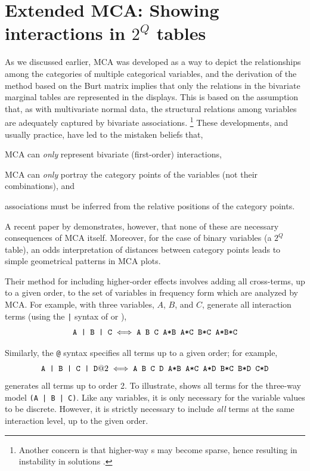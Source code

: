 \section{Extended MCA: Showing interactions in $2^Q$ tables}\label{sec:ca-mcainter}
As we discussed earlier,
MCA was developed as a way to depict the relationships among the
categories of multiple categorical variables, and the derivation of
the method based on the Burt matrix implies that only the relations
in the bivariate marginal tables are represented in the displays.
This is based on the assumption \citep{Gifi:90,Greenacre:88}
that, as with multivariate normal data, the structural relations
among variables are adequately captured by bivariate associations.%
\footnote{Another concern is that higher-way \ctab s may become
sparse, hence resulting in instability in solutions
\citep{Heijden:87}.}
These developments, and usually practice, have led to the mistaken beliefs that,
\begin{seriate}
\item MCA can \emph{only}
represent bivariate (first-order) interactions,
\item MCA can \emph{only} portray the category points of the variables
(not their combinations), and
\item associations must be inferred from the relative positions of
the category points.
\end{seriate}

A recent paper by \citet{MeulmanHeiser:97} demonstrates, however,
that none of these are necessary consequences of MCA itself.
Moreover, for the case of binary variables (a $2^Q$ table),
an odds interpretation of distances between category points
leads to simple geometrical patterns in MCA plots.

Their method for including higher-order effects involves adding all cross-terms,
up to a given order,
to the set of variables in frequency form which are analyzed by
MCA.  For example, with three variables, $A$, $B$, and $C$,
generate all interaction terms (using the \texttt{|} syntax of
 or ),
\begin{equation*}
\mbox{\texttt{A | B | C}} \iff \mbox{\texttt{A B C A*B A*C B*C A*B*C}}
\end{equation*}

Similarly, the \texttt{@} syntax specifies all terms up to a given
order; for example,
\begin{equation*}
\mbox{\texttt{A | B | C | D}@2} \iff \mbox{\texttt{A B C D A*B A*C A*D B*C B*D C*D}}
\end{equation*}
generates all
terms up to order 2.  To illustrate,  shows all terms
for the three-way model \texttt{(A | B | C)}.
Like any  variables, it is only necessary for the variable
values to be discrete.
However, it is strictly necessary to include \emph{all} terms at the same
interaction level, up to the given order.

